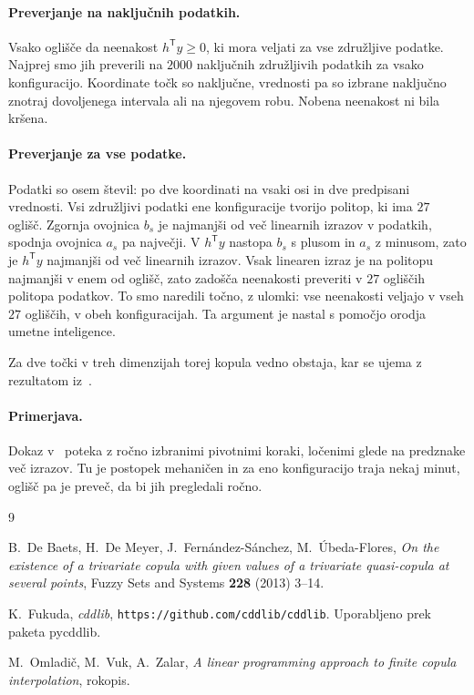 \documentclass[11pt,a4paper]{article}
\begin{document}
\paragraph{Preverjanje na naključnih podatkih.} Vsako oglišče da neenakost $h^{\mathsf T} y \ge 0$, ki mora veljati za vse združljive podatke. Najprej smo jih preverili na $2000$ naključnih združljivih podatkih za vsako konfiguracijo. Koordinate točk so naključne, vrednosti pa so izbrane naključno znotraj dovoljenega intervala ali na njegovem robu. Nobena neenakost ni bila kršena.

\paragraph{Preverjanje za vse podatke.} Podatki so osem števil: po dve koordinati na vsaki osi in dve predpisani vrednosti. Vsi združljivi podatki ene konfiguracije tvorijo politop, ki ima $27$ oglišč. Zgornja ovojnica $b_s$ je najmanjši od več linearnih izrazov v podatkih, spodnja ovojnica $a_s$ pa največji. V $h^{\mathsf T} y$ nastopa $b_s$ s plusom in $a_s$ z minusom, zato je $h^{\mathsf T} y$ najmanjši od več linearnih izrazov. Vsak linearen izraz je na politopu najmanjši v enem od oglišč, zato zadošča neenakosti preveriti v $27$ ogliščih politopa podatkov. To smo naredili točno, z ulomki: vse neenakosti veljajo v vseh $27$ ogliščih, v obeh konfiguracijah. Ta argument je nastal s pomočjo orodja umetne inteligence.

Za dve točki v treh dimenzijah torej kopula vedno obstaja, kar se ujema z rezultatom iz~\cite{DeBaets}.

\paragraph{Primerjava.} Dokaz v~\cite{DeBaets} poteka z ročno izbranimi pivotnimi koraki, ločenimi glede na predznake več izrazov. Tu je postopek mehaničen in za eno konfiguracijo traja nekaj minut, oglišč pa je preveč, da bi jih pregledali ročno.

\begin{thebibliography}{9}
\raggedright
{}
B.~De Baets, H.~De Meyer, J.~Fernández-Sánchez, M.~Úbeda-Flores,
\emph{On the existence of a trivariate copula with given values of a trivariate quasi-copula at several points},
Fuzzy Sets and Systems \textbf{228} (2013) 3--14.

K.~Fukuda, \emph{cddlib}, \texttt{https://github.com/cddlib/cddlib}. Uporabljeno prek paketa pycddlib.

M.~Omladič, M.~Vuk, A.~Zalar,
\emph{A linear programming approach to finite copula interpolation}, rokopis.
\end{thebibliography}
\end{document}

